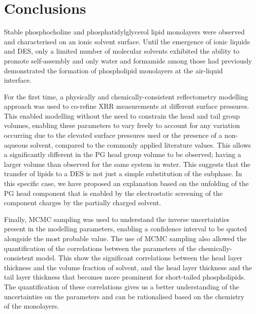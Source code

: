 \section{Conclusions}
Stable phosphocholine and phosphatidylglycerol lipid monolayers were observed and characterised on an ionic solvent surface.
Until the emergence of ionic liquids and DES, only a limited number of molecular solvents exhibited the ability to promote self-assembly and only water and formamide among those had previously demonstrated the formation of phospholipid monolayers at the air-liquid interface.

For the first time, a physically and chemically-consistent reflectometry modelling approach was used to co-refine XRR measurements at different surface pressures.
This enabled modelling without the need to constrain the head and tail group volumes, enabling these parameters to vary freely to account for any variation occurring due to the elevated surface pressures used or the presence of a non-aqueous solvent, compared to the commonly applied literature values.
This allows a significantly different in the PG head group volume to be observed; having a larger volume than observed for the same system in water.
This suggests that the transfer of lipids to a DES is not just a simple substitution of the subphase.
In this specific case, we have proposed an explanation based on the unfolding of the PG head component that is enabled by the electrostatic screening of the component charges by the partially charged solvent.

Finally, MCMC sampling was used to understand the inverse uncertainties present in the modelling parameters, enabling a confidence interval to be quoted alongside the most probable value.
The use of MCMC sampling also allowed the quantification of the correlations between the parameters of the chemically-consistent model.
This show the significant correlations between the head layer thickness and the volume fraction of solvent, and the head layer thickness and the tail layer thickness that becomes more prominent for short-tailed phospholipids.
The quantification of these correlations gives us a better understanding of the uncertainties on the parameters and can be rationalised based on the chemistry of the monolayers.
